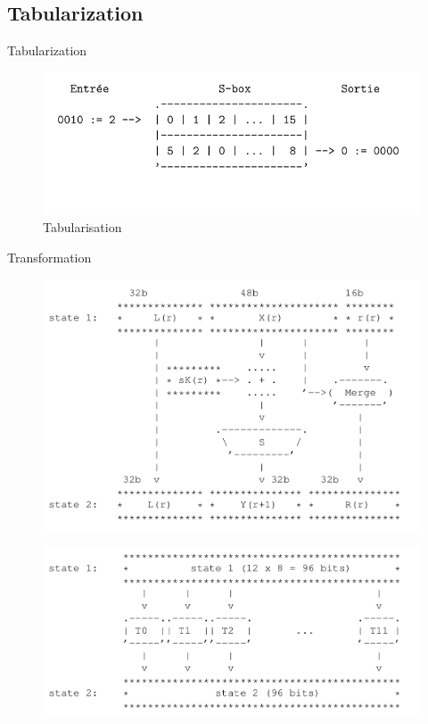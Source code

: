 \documentclass{beamer}
\begin{document}
\subsection{Tabularization}

\begin{frame}[fragile]{Tabularization}
\begin{figure}[h]
\centering
\includegraphics[scale=0.60]{images/tabu.png}
\caption{Tabularisation}
\label{fig:keygen}
\end{figure}
\end{frame}

\begin{frame}{Transformation}
\begin{figure}[h]
\centering
\includegraphics[scale=0.20]{images/etape_1_avant.png}

\end{figure}

\begin{figure}[h]
\centering
\includegraphics[scale=0.20]{images/etape_1_apres.png}
\end{figure}
\end{frame}
\end{document}
